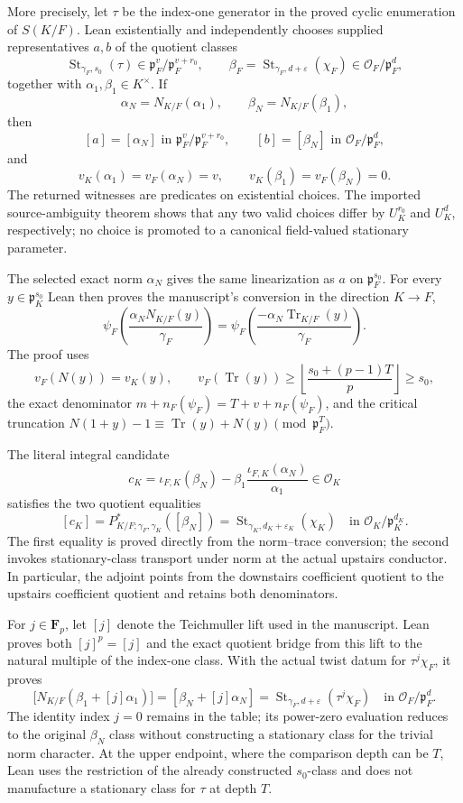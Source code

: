 \begin{theorem}
More precisely, let $\tau$ be the index-one generator in the proved cyclic
enumeration of $S(K/F)$.  Lean existentially and independently chooses
supplied representatives $a,b$ of the quotient classes
\[
 \operatorname{St}_{\gamma_F,s_0}(\tau)
   \in\mathfrak p_F^v/\mathfrak p_F^{v+r_0},
 \qquad
 \beta_F=\operatorname{St}_{\gamma_F,d+\varepsilon}(\chi_F)
   \in\mathcal O_F/\mathfrak p_F^d,
\]
together with $\alpha_1,\beta_1\in K^\times$.  If
\[
 \alpha_N=N_{K/F}(\alpha_1),\qquad
 \beta_N=N_{K/F}(\beta_1),
\]
then
\[
 [a]=[\alpha_N]
   \text{ in }\mathfrak p_F^v/\mathfrak p_F^{v+r_0},
 \qquad
 [b]=[\beta_N]
   \text{ in }\mathcal O_F/\mathfrak p_F^d,
\]
and
\[
 v_K(\alpha_1)=v_F(\alpha_N)=v,
 \qquad v_K(\beta_1)=v_F(\beta_N)=0.
\]
The returned witnesses are predicates on existential choices.  The
imported source-ambiguity theorem shows that any two valid choices differ
by $U_K^{r_0}$ and $U_K^d$, respectively; no choice is promoted to a
canonical field-valued stationary parameter.

The selected exact norm $\alpha_N$ gives the same linearization as $a$ on
$\mathfrak p_F^{s_0}$.  For every $y\in\mathfrak p_K^{s_0}$ Lean then
proves the manuscript's conversion in the direction $K\to F$,
\[
 \psi_F\!\left(\frac{\alpha_NN_{K/F}(y)}{\gamma_F}\right)
 =
 \psi_F\!\left(\frac{-\alpha_N\operatorname{Tr}_{K/F}(y)}
                         {\gamma_F}\right).
\]
The proof uses
\[
 v_F(N(y))=v_K(y),\qquad
 v_F(\operatorname{Tr}(y))
 \ge\left\lfloor\frac{s_0+(p-1)T}{p}\right\rfloor\ge s_0,
\]
the exact denominator $m+n_F(\psi_F)=T+v+n_F(\psi_F)$, and the critical
truncation $N(1+y)-1\equiv\operatorname{Tr}(y)+N(y)\pmod{\mathfrak p_F^T}$.

The literal integral candidate
\[
 c_K=\iota_{F,K}(\beta_N)
       -\beta_1\frac{\iota_{F,K}(\alpha_N)}{\alpha_1}
 \in\mathcal O_K
\]
satisfies the two quotient equalities
\[
 [c_K]
 =P^*_{K/F;\gamma_F,\gamma_K}([\beta_N])
 =\operatorname{St}_{\gamma_K,d_K+\varepsilon_K}(\chi_K)
 \quad\text{in }\mathcal O_K/\mathfrak p_K^{d_K}.
\]
The first equality is proved directly from the norm--trace conversion; the
second invokes stationary-class transport under norm at the actual upstairs
conductor.  In particular, the adjoint points from the downstairs
coefficient quotient to the upstairs coefficient quotient and retains both
denominators.

For $j\in\mathbf F_p$, let $[j]$ denote the Teichmuller lift used in the
manuscript.  Lean proves both $[j]^p=[j]$ and the exact quotient bridge from
this lift to the natural multiple of the index-one class.  With the actual
twist datum for $\tau^j\chi_F$, it proves
\[
 \bigl[N_{K/F}(\beta_1+[j]\alpha_1)\bigr]
 = [\beta_N+[j]\alpha_N]
 = \operatorname{St}_{\gamma_F,d+\varepsilon}(\tau^j\chi_F)
 \quad\text{in }\mathcal O_F/\mathfrak p_F^d.
\]
The identity index $j=0$ remains in the table; its power-zero evaluation
reduces to the original $\beta_N$ class without constructing a stationary
class for the trivial norm character.
At the upper endpoint, where the comparison depth can be $T$, Lean uses
the restriction of the already constructed $s_0$-class and does not
manufacture a stationary class for $\tau$ at depth $T$.


\end{theorem}
